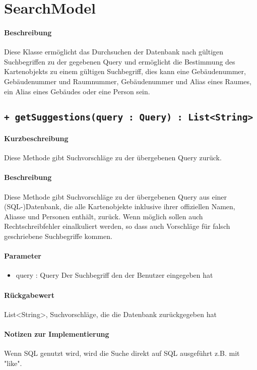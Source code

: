 \section{SearchModel}
\paragraph*{Beschreibung}
Diese Klasse ermöglicht das Durchsuchen der Datenbank nach gültigen Suchbegriffen zu der gegebenen Query 
und ermöglicht die Bestimmung des Kartenobjekts zu einem gültigen Suchbegriff, 
dies kann eine Gebäudenummer, Gebäudenummer und Raumnummer, Gebäudenummer und Alias eines Raumes, ein Alias eines Gebäudes oder eine Person sein.

\subsection{\texttt{+ getSuggestions(query : Query) : List<String>}}%
\paragraph*{Kurzbeschreibung}
Diese Methode gibt Suchvorschläge zu der übergebenen Query zurück.
\paragraph*{Beschreibung}
Diese Methode gibt Suchvorschläge zu der übergebenen Query aus einer (SQL-)Datenbank, 
die alle Kartenobjekte inklusive ihrer offiziellen Namen, Aliasse und Personen enthält, zurück.
Wenn möglich sollen auch Rechtschreibfehler einalkuliert werden, so dass auch Vorschläge für falsch geschriebene Suchbegriffe kommen.
\paragraph*{Parameter}
\begin{itemize}
    \item query : Query Der Suchbegriff den der Benutzer eingegeben hat
\end{itemize}
\paragraph*{Rückgabewert}
List<String>, Suchvorschläge, die die Datenbank zurückgegeben hat
\paragraph*{Notizen zur Implementierung}
Wenn SQL genutzt wird, wird die Suche direkt auf SQL ausgeführt z.B. mit "like".

